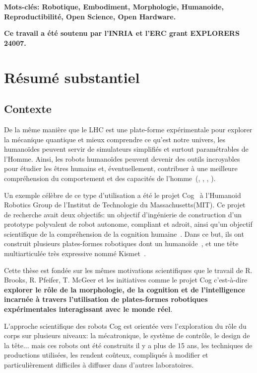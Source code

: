 \textbf{Mots-clés: Robotique, Embodiment, Morphologie, Humanoide, Reproductibilité, Open Science, Open Hardware.} 

\textbf{Ce travail a été soutenu par l'INRIA et l'ERC grant EXPLORERS 24007.}



\cleartoleftpage 
\cleardoublepage


\chapter*{Résumé substantiel}


\section*{Contexte} %

De la même manière que le LHC est une plate-forme expérimentale pour explorer la mécanique quantique et mieux comprendre ce qu’est notre univers, les humanoïdes peuvent servir de simulateurs simplifiés et surtout paramétrables de l'Homme. Ainsi, les robots humanoïdes peuvent devenir des outils incroyables pour étudier les êtres humains et, éventuellement, contribuer à une meilleure compréhension du comportement et des capacités de l’homme~(\cite{atkeson2000using}, \cite{cheng2007cb}, \cite{brooks1986achieving}, \cite{oudeyer2010impact}).

Un exemple célèbre de ce type  d’utilisation a été le projet Cog~\parencite{brooks1999cog} à l'Humanoid Robotics Group de l'Institut de Technologie du Massachusetts(MIT). Ce projet de recherche avait deux objectifs: un objectif d'ingénierie de construction d'un prototype polyvalent de robot autonome, compliant et adroit, ainsi qu’un objectif scientifique de la compréhension de la cognition humaine~\parencite{brooks1994building}. Dans ce but, ils ont construit plusieurs plates-formes robotiques dont un humanoïde~\parencite{brooks1999cog}, et une tête multiarticulée très expressive nommé Kismet~\parencite{breazeal2003emotion}.

Cette thèse est fondée sur les mêmes motivations scientifiques que le travail de R. Brooks, R. Pfeifer, T. McGeer et les initiatives comme le projet Cog c’est-à-dire \textbf{explorer le rôle de la morphologie, de la cognition et de l'intelligence incarnée à travers l'utilisation de plates-formes robotiques expérimentales interagissant avec le monde réel}.

L'approche scientifique des robots Cog est orientée vers l'exploration du rôle du corps sur plusieurs niveaux: la mécatronique, le système de contrôle, le design de la tête...  mais ces robots ont été construits il y a plus de 15 ans, les techniques de productions utilisées, les rendent coûteux, compliqués à modifier et particulièrement difficiles à diffuser dans d'autres laboratoires.

